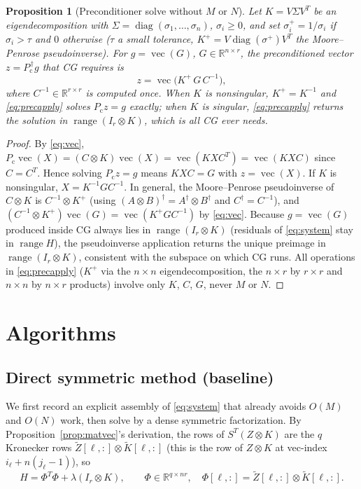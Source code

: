 \documentclass[12pt]{article}
\DeclareMathOperator{\vecop}{vec}
\DeclareMathOperator{\diag}{diag}
\DeclareMathOperator{\range}{range}
\newcommand{\bR}{\mathbb{R}}
\newcommand{\tZ}{\tilde Z}
\newcommand{\tK}{\tilde K}
\newtheorem{proposition}{Proposition}
\begin{document}
\begin{proposition}[Preconditioner solve without $M$ or $N$]\label{prop:precsolve}
Let $K=V\Sigma V^{T}$ be an eigendecomposition with $\Sigma=\diag(\sigma_1,\dots,\sigma_n)$,
$\sigma_i\ge0$, and set $\sigma_i^{+}=1/\sigma_i$ if $\sigma_i>\tau$ and $0$
otherwise ($\tau$ a small tolerance, $K^{+}=V\diag(\sigma^{+})V^{T}$ the
Moore--Penrose pseudoinverse). For $g=\vecop(G)$, $G\in\bR^{n\times r}$, the
preconditioned vector $z=P_{\mathrm{c}}^{\,\dagger}g$ that CG requires is
\begin{equation}\label{eq:precapply}
  z=\vecop\!\big(K^{+}\,G\,C^{-1}\big),
\end{equation}
where $C^{-1}\in\bR^{r\times r}$ is computed once. When $K$ is nonsingular,
$K^{+}=K^{-1}$ and \eqref{eq:precapply} solves $P_{\mathrm{c}}z=g$ exactly; when $K$
is singular, \eqref{eq:precapply} returns the solution in $\range(I_r\otimes K)$,
which is all CG ever needs.
\end{proposition}
\begin{proof}
By \eqref{eq:vec}, $P_{\mathrm{c}}\vecop(X)=(C\otimes K)\vecop(X)=\vecop(KXC^{T})=\vecop(KXC)$
since $C=C^{T}$. Hence solving $P_{\mathrm{c}}z=g$ means $KXC=G$ with $z=\vecop(X)$.
If $K$ is nonsingular, $X=K^{-1}GC^{-1}$. In general, the Moore--Penrose pseudoinverse
of $C\otimes K$ is $C^{-1}\otimes K^{+}$ (using $(A\otimes B)^{\dagger}=A^{\dagger}\otimes B^{\dagger}$
and $C^{\dagger}=C^{-1}$), and $(C^{-1}\otimes K^{+})\vecop(G)=\vecop(K^{+}GC^{-1})$
by \eqref{eq:vec}. Because $g=\vecop(G)$ produced inside CG always lies in
$\range(I_r\otimes K)$ (residuals of \eqref{eq:system} stay in $\range H$), the
pseudoinverse application returns the unique preimage in $\range(I_r\otimes K)$,
consistent with the subspace on which CG runs. All operations in \eqref{eq:precapply}
($K^{+}$ via the $n\times n$ eigendecomposition, the $n\times r$ by $r\times r$ and
$n\times n$ by $n\times r$ products) involve only $K$, $C$, $G$, never $M$ or $N$.
\end{proof}

\section{Algorithms}

\subsection{Direct symmetric method (baseline)}

We first record an explicit assembly of \eqref{eq:system} that already avoids $O(M)$
and $O(N)$ work, then solve by a dense symmetric factorization. By
Proposition~\ref{prop:matvec}'s derivation, the rows of $S^{T}(Z\otimes K)$ are the
$q$ Kronecker rows $\tZ[\ell,:]\otimes\tK[\ell,:]$ (this is the row of $Z\otimes K$
at vec-index $i_\ell+n(j_\ell-1)$), so
\[
  H=\Phi^{T}\Phi+\lambda(I_r\otimes K),\qquad
  \Phi\in\bR^{q\times nr},\quad \Phi[\ell,:]=\tZ[\ell,:]\otimes\tK[\ell,:].
\]
\end{document}
